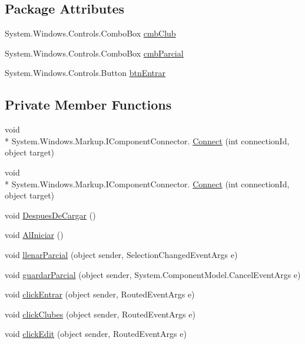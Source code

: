 \subsection*{Package Attributes}
\begin{DoxyCompactItemize}
\item 
System.\-Windows.\-Controls.\-Combo\-Box \hyperlink{class_asistencias__wpf_1_1_seleccion_adac0d1aa55be26c4cff9a610ee20b9c5}{cmb\-Club}
\item 
System.\-Windows.\-Controls.\-Combo\-Box \hyperlink{class_asistencias__wpf_1_1_seleccion_a24db3199864aca68b55959ae7477bb3b}{cmb\-Parcial}
\item 
System.\-Windows.\-Controls.\-Button \hyperlink{class_asistencias__wpf_1_1_seleccion_a7c5e0a561a721c40c2173b532d0995cf}{btn\-Entrar}
\end{DoxyCompactItemize}
\subsection*{Private Member Functions}
\begin{DoxyCompactItemize}
\item 
void \\*
System.\-Windows.\-Markup.\-I\-Component\-Connector. \hyperlink{class_asistencias__wpf_1_1_seleccion_a41988115d1df1455f23592e43778f392}{Connect} (int connection\-Id, object target)
\item 
void \\*
System.\-Windows.\-Markup.\-I\-Component\-Connector. \hyperlink{class_asistencias__wpf_1_1_seleccion_a41988115d1df1455f23592e43778f392}{Connect} (int connection\-Id, object target)
\item 
void \hyperlink{class_asistencias__wpf_1_1_seleccion_a849c0611846aae842c51b04d41226dad}{Despues\-De\-Cargar} ()
\item 
void \hyperlink{class_asistencias__wpf_1_1_seleccion_af3f1fb5d6a19a54b3f9af080a5415bf8}{Al\-Iniciar} ()
\item 
void \hyperlink{class_asistencias__wpf_1_1_seleccion_a202ae9606e4234345de3f89402572d0b}{llenar\-Parcial} (object sender, Selection\-Changed\-Event\-Args e)
\item 
void \hyperlink{class_asistencias__wpf_1_1_seleccion_a7033e092b4bf1872958ed29087a33b63}{guardar\-Parcial} (object sender, System.\-Component\-Model.\-Cancel\-Event\-Args e)
\item 
void \hyperlink{class_asistencias__wpf_1_1_seleccion_ab8e85da35b7eb9e11d124c20d1ca63d0}{click\-Entrar} (object sender, Routed\-Event\-Args e)
\item 
void \hyperlink{class_asistencias__wpf_1_1_seleccion_aba5ac4fad507a4b3a9279b081d20601b}{click\-Clubes} (object sender, Routed\-Event\-Args e)
\item 
void \hyperlink{class_asistencias__wpf_1_1_seleccion_a965e20ba0b78a34e30ea161446864cf2}{click\-Edit} (object sender, Routed\-Event\-Args e)
\end{DoxyCompactItemize}
